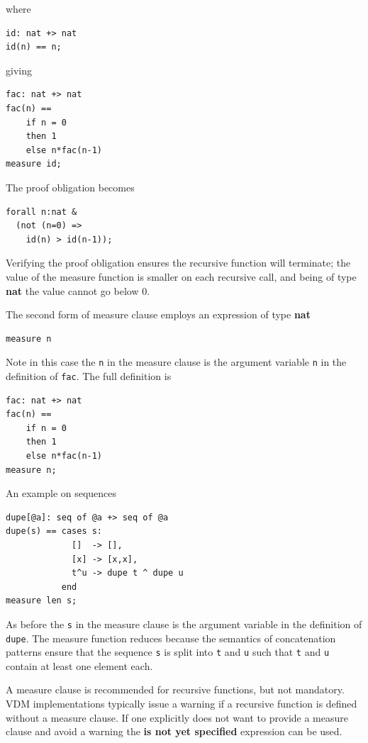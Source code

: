 \documentclass{overturerepchap}
\newcommand{\keyw}[1]{{\bf\ttfamily #1}}
\begin{document}
where

\begin{lstlisting}
id: nat +> nat
id(n) == n;
\end{lstlisting}

giving

\begin{lstlisting}
fac: nat +> nat
fac(n) ==
    if n = 0
    then 1
    else n*fac(n-1)
measure id;
\end{lstlisting}

The proof obligation becomes

\begin{lstlisting}
forall n:nat &
  (not (n=0) =>
    id(n) > id(n-1));
\end{lstlisting}

Verifying the proof obligation ensures the recursive function will terminate; the value of the measure function is smaller on each recursive call, and being of type \keyw{nat} the value cannot go below 0.

The second form of measure clause employs an expression of type \keyw{nat}

\begin{lstlisting}
measure n
\end{lstlisting}

Note in this case the {\tt n} in the measure clause is the argument variable {\tt n} in the definition of {\tt fac}. The full definition is

\begin{lstlisting}
fac: nat +> nat
fac(n) ==
    if n = 0
    then 1
    else n*fac(n-1)
measure n;
\end{lstlisting}

An example on sequences

\begin{lstlisting}
dupe[@a]: seq of @a +> seq of @a
dupe(s) == cases s:
             []  -> [],
             [x] -> [x,x],
             t^u -> dupe t ^ dupe u
           end
measure len s;
\end{lstlisting}

As before the {\tt s} in the measure clause is the argument variable in the definition of {\tt dupe}. The measure function reduces because the semantics of concatenation patterns ensure that the sequence {\tt s} is split into {\tt t} and {\tt u} such that {\tt t} and {\tt u} contain at least one element each.

A measure clause is recommended for recursive functions, but not mandatory. VDM implementations typically issue a warning if a recursive function is defined without a measure clause. If one explicitly does not want to provide a measure clause and avoid a warning the \keyw{is not yet specified} expression can be used.
\end{document}
